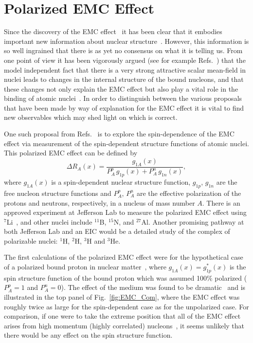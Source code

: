 \section{Polarized EMC Effect\label{sec:pemc}}
%
Since the discovery of the EMC effect~\cite{Aubert:1983xm,Bodek:1983ec} it has been clear that it embodies important new information about nuclear structure~\cite{Geesaman:1995yd}. However, this information is so well ingrained that there is as yet no consensus on what it is telling us. From one point of view it has been vigorously argued (see for example Refs.~\cite{Mineo:2003vc,Thomas:2016bxx,Guichon:2018uew}) that the model independent fact that there is a very strong attractive scalar mean-field in nuclei leads to changes in the internal structure of the bound nucleons, and that these changes not only explain the EMC effect but also play a vital role in the binding of atomic nuclei~\cite{Stone:2017oqt,Stone:2016qmi}. In order to distinguish between the various proposals that have been made by way of explanation for the EMC effect it is vital to find new observables which may shed light on which is correct.

One such proposal from Refs.~\cite{Cloet:2005rt,Cloet:2006bq} is to explore the spin-dependence of the EMC effect via measurement of the spin-dependent structure functions of atomic nuclei. This polarized EMC effect can be defined by
%
\begin{equation}
\Delta R_A(x) = \frac{g_{1A}(x)}{P_A^p\,g_{1p}(x) + P_A^n\,g_{1n}(x)},
\label{eq:pemc}
\end{equation}
%
where $g_{1A}(x)$ is a spin-dependent nuclear structure function, $g_{1p}$, $g_{1n}$ are the free nucleon structure functions and $P_A^p$, $P_A^n$ are the effective polarization of the protons and neutrons, respectively, in a nucleus of mass number $A$. There is an approved experiment at Jefferson Lab to measure the polarized EMC effect using $^7$Li~\cite{jlabspin}, and other nuclei include $^{11}$B, $^{15}$N, and $^{27}$Al. Another promising pathway at both Jefferson Lab and an EIC would be a detailed study of the complex of polarizable nuclei: $^1$H, $^2$H, $^3$H and $^3$He.

The first calculations of the polarized EMC effect were for the hypothetical case of a polarized bound proton in nuclear matter~\cite{Cloet:2005rt}, where $g_{1A}(x) = g_{1p}^*(x)$ is the spin structure function of the bound proton which was assumed 100\% polarized ($P_A^p=1$ and $P_A^n = 0$). The effect of the medium was found to be dramatic~\cite{Cloet:2005rt} and is illustrated in the top panel of Fig.~\ref{fig:EMC_Com}, where the EMC effect was roughly twice as large for the spin-dependent case as for the unpolarized case.  For comparison, if one were to take the extreme position that all of the EMC effect arises from high momentum (highly correlated) nucleons~\cite{Weinstein:2010rt}, it seems unlikely that there would be any effect on the spin structure function.

